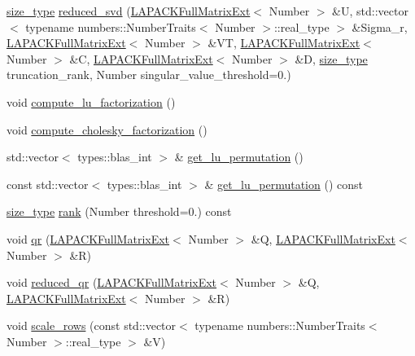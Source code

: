 \begin{DoxyCompactItemize}
\item 
\hyperlink{classLAPACKFullMatrixExt_a5cf5f4a6104dc17029210b5ca52bf574}{size\+\_\+type} \hyperlink{classLAPACKFullMatrixExt_aeafd1f1aca169f4b9164f0a5e521e8cb}{reduced\+\_\+svd} (\hyperlink{classLAPACKFullMatrixExt}{L\+A\+P\+A\+C\+K\+Full\+Matrix\+Ext}$<$ Number $>$ \&U, std\+::vector$<$ typename numbers\+::\+Number\+Traits$<$ Number $>$\+::real\+\_\+type $>$ \&Sigma\+\_\+r, \hyperlink{classLAPACKFullMatrixExt}{L\+A\+P\+A\+C\+K\+Full\+Matrix\+Ext}$<$ Number $>$ \&VT, \hyperlink{classLAPACKFullMatrixExt}{L\+A\+P\+A\+C\+K\+Full\+Matrix\+Ext}$<$ Number $>$ \&C, \hyperlink{classLAPACKFullMatrixExt}{L\+A\+P\+A\+C\+K\+Full\+Matrix\+Ext}$<$ Number $>$ \&D, \hyperlink{classLAPACKFullMatrixExt_a5cf5f4a6104dc17029210b5ca52bf574}{size\+\_\+type} truncation\+\_\+rank, Number singular\+\_\+value\+\_\+threshold=0.)
\item 
void \hyperlink{classLAPACKFullMatrixExt_a110a711628c9d66adb2161779f2ecf63}{compute\+\_\+lu\+\_\+factorization} ()
\item 
void \hyperlink{classLAPACKFullMatrixExt_a6aaaec84d900ee2dface5b80614ce30f}{compute\+\_\+cholesky\+\_\+factorization} ()
\item 
std\+::vector$<$ types\+::blas\+\_\+int $>$ \& \hyperlink{classLAPACKFullMatrixExt_a623bea36c16f0320c2f750f5881f9214}{get\+\_\+lu\+\_\+permutation} ()
\item 
const std\+::vector$<$ types\+::blas\+\_\+int $>$ \& \hyperlink{classLAPACKFullMatrixExt_a2f435bd8d68ef6da859405ff5c583cd0}{get\+\_\+lu\+\_\+permutation} () const
\item 
\hyperlink{classLAPACKFullMatrixExt_a5cf5f4a6104dc17029210b5ca52bf574}{size\+\_\+type} \hyperlink{classLAPACKFullMatrixExt_a94f6a6df2b48201549f58bcbadcc6053}{rank} (Number threshold=0.) const
\item 
void \hyperlink{classLAPACKFullMatrixExt_a0413f3b6186f8e8fc0f2cb2e0cb5cc42}{qr} (\hyperlink{classLAPACKFullMatrixExt}{L\+A\+P\+A\+C\+K\+Full\+Matrix\+Ext}$<$ Number $>$ \&Q, \hyperlink{classLAPACKFullMatrixExt}{L\+A\+P\+A\+C\+K\+Full\+Matrix\+Ext}$<$ Number $>$ \&R)
\item 
void \hyperlink{classLAPACKFullMatrixExt_a2d29694b336c319402fd867658a25253}{reduced\+\_\+qr} (\hyperlink{classLAPACKFullMatrixExt}{L\+A\+P\+A\+C\+K\+Full\+Matrix\+Ext}$<$ Number $>$ \&Q, \hyperlink{classLAPACKFullMatrixExt}{L\+A\+P\+A\+C\+K\+Full\+Matrix\+Ext}$<$ Number $>$ \&R)
\item 
void \hyperlink{classLAPACKFullMatrixExt_aae9a6124afe70d17335d6338f323f22a}{scale\+\_\+rows} (const std\+::vector$<$ typename numbers\+::\+Number\+Traits$<$ Number $>$\+::real\+\_\+type $>$ \&V)

\end{DoxyCompactItemize}
